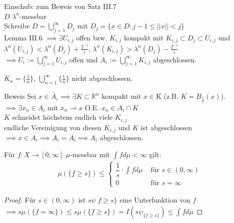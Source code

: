   \begin{remark}
    Einschub: zum Beweis von Satz III.7 \\
    $D$ $\lambda^n$-messbar \\ 
    Schreibe $D = \bigcup\limits_{j=1}^\infty D_j$ mit $D_j = \{x\in D: j-1 \leq ||x|| < j\}$ \\
    Lemma III.6 $\implies \exists U_{i,j}$ offen bzw. $K_{i,j}$ kompakt mit $K_{i,j}  \subset D_j \subset U_{i,j}$ und \\ $\lambda^n (U_{i,j}) < \lambda^n (D_j) + \frac{2^{-j}}{i}$, $\lambda^n (K_{i,j}) > \lambda^n (D_j) - \frac{2^{-j}}{i}$ \\
    $\implies U_i := \bigcup\limits_{j=1}^\infty U_{i,j}$ offen und $A_i := \bigcup\limits_{j=1}^\infty K_{i,j}$ abgeschlossen.
  \end{remark}
  \begin{example}
  	$K_n = \{\frac{1}{n}\}$, $\bigcup\limits_{n=1}^\infty \{ \frac{1}{n}\}$ nicht abgeschlossen. \\
  	\item[Beweis] Sei $x\in \bar{A}_i \implies \exists K\subset \mathbb{R}^n$ kompakt mit $x\in $\r{K} (z.B. $K = \overline{B_{\frac{1}{2}}(x)}$). \\
  	$\implies \exists x_n \in A_i$ mit $x_n \to x$ O.E. $x_n \in A_i\cap K$ \\
  	$K$ schneidet höchstens endlich viele $K_{i,j}$ \\ 
  	endliche Vereinigung von diesen $K_{i,j}$ und $K$ ist abgeschlossen \\
  	$\implies x\in A_i \implies A_i = \overline{A_i} \implies A_i$ abgeschlossen.
  \end{example}

  \begin{lemma}
    Für $f:X \to [0, \infty]$ $\mu$-messbar mit $\int f d\mu < \infty$ gilt:
    \begin{align*}
      \mu(\{f\geq s\}) \leq \begin{cases}
        \dfrac{1}{s} \cdot \int f d\mu & \text{ für } s \in (0, \infty)\\
        0 & \text{ für } s = \infty
      \end{cases}
    \end{align*}
  \end{lemma}

  \begin{proof}
    Für $s \in (0,\infty)$ ist $s \psi_{}\ f \geq s {\}}$ eine Unterfunktion von $f$ \\ $\implies s \mu (\{f = \infty\}) \leq s \mu (\{f\geq s \}) = I(s\psi_{\{f\geq s\}}) \leq \int f d\mu$
  \end{proof}


